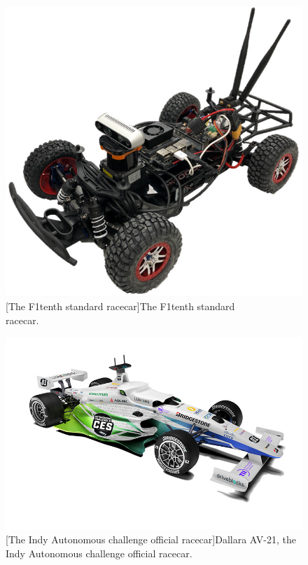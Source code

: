 \begin{figure}
\centering
\begin{minipage}{.5\textwidth}
  \centering
  \includegraphics[height=.6\linewidth]{contents/chapt1/figs/f1tenth_car.png}
  [The F1tenth standard racecar]{The F1tenth standard \\racecar.}
  \label{fig:f1tenth_car}
\end{minipage}%
\begin{minipage}{.5\textwidth}
  \centering
  \includegraphics[height=.6\linewidth]{contents/chapt1/figs/indy_auto_car.jpg}
  [The Indy Autonomous challenge official racecar]{Dallara AV-21, the Indy Autonomous challenge official racecar.}
  \label{fig:iac_car}
\end{minipage}
\end{figure}


